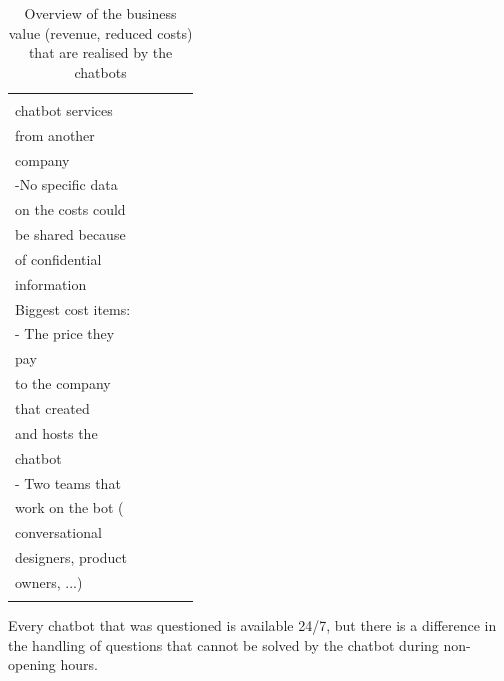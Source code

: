 \begin{longtable}[c]{|lllll|}
	\begin{tabular}[c]{@{}l@{}}- They buy the \\ chatbot services \\ from another \\ company\\ -No specific data \\ on the costs could \\ be shared because \\ of confidential\\ information\\ Biggest cost items:\\ - The price they \\ pay\\ to the company\\ that created \\ and hosts the \\ chatbot\\ - Two teams that \\ work on the bot (\\ conversational\\ designers, product\\ owners, ...)\end{tabular} \\ \hline
	\caption{Overview of the business value (revenue, reduced costs) that are realised by the chatbots}
	\label{tab:businessValue}\\
\end{longtable}
Every chatbot that was questioned is available 24/7, but there is a difference in the handling of questions that cannot be solved by the chatbot during non-opening hours.\\
\break
